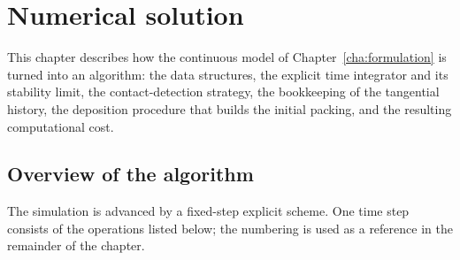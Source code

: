 \chapter{Numerical solution}
\label{cha:numerical}

This chapter describes how the continuous model of Chapter~\ref{cha:formulation}
is turned into an algorithm: the data structures, the explicit time integrator
and its stability limit, the contact-detection strategy, the bookkeeping of the
tangential history, the deposition procedure that builds the initial packing,
and the resulting computational cost.

\section{Overview of the algorithm}
\label{sec:overview}

The simulation is advanced by a fixed-step explicit scheme.  One time step
consists of the operations listed below; the numbering is used as a reference in
the remainder of the chapter.

